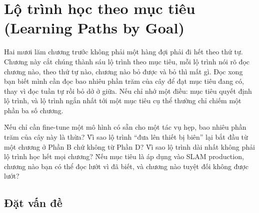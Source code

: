 \documentclass[../../deep_learning.tex]{subfiles}
\begin{document}
\chapter{Lộ trình học theo mục tiêu (Learning Paths by Goal)}

\begin{tomtat}
Hai mươi lăm chương trước không phải một hàng đợi phải đi hết theo thứ tự. Chương này cắt chúng thành sáu lộ trình theo mục tiêu, mỗi lộ trình nói rõ đọc chương nào, theo thứ tự nào, chương nào bỏ được và bỏ thì mất gì. Đọc xong bạn biết mình cần đọc bao nhiêu phần trăm của cây để đạt mục tiêu đang có, thay vì đọc tuần tự rồi bỏ dở ở giữa. Nếu chỉ nhớ một điều: mục tiêu quyết định lộ trình, và lộ trình ngắn nhất tới một mục tiêu cụ thể thường chỉ chiếm một phần ba số chương.
\end{tomtat}

\begin{nentang}
\end{nentang}

\begin{khoigoi}
\h{Nếu chỉ cần fine-tune một mô hình có sẵn cho một tác vụ hẹp, bao nhiêu phần trăm của cây này là thừa?}
\h{Vì sao lộ trình ``đưa lên thiết bị biên'' lại bắt đầu từ một chương ở Phần B chứ không từ Phần D?}
\h{Vì sao lộ trình dài nhất không phải lộ trình học hết mọi chương?}
\h{Nếu mục tiêu là áp dụng vào SLAM production, chương nào bạn có thể đọc lướt vì đã biết, và chương nào tuyệt đối không được lướt?}
\end{khoigoi}

\section{Đặt vấn đề}
\end{document}
